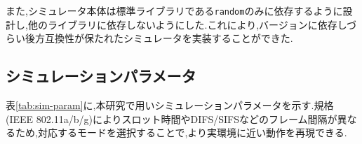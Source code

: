 \documentclass[a4paper, 10pt]{ltjsarticle}
\begin{document}
また,シミュレータ本体は標準ライブラリである\texttt{random}のみに依存するように設計し,他のライブラリに依存しないようにした.これにより,バージョンに依存しづらい後方互換性が保たれたシミュレータを実装することができた.




\subsection{シミュレーションパラメータ}
表\ref{tab:sim-param}に,本研究で用いシミュレーションパラメータを示す.規格(IEEE 802.11a/b/g)によりスロット時間やDIFS/SIFSなどのフレーム間隔が異なるため,対応するモードを選択することで,より実環境に近い動作を再現できる.
\end{document}
